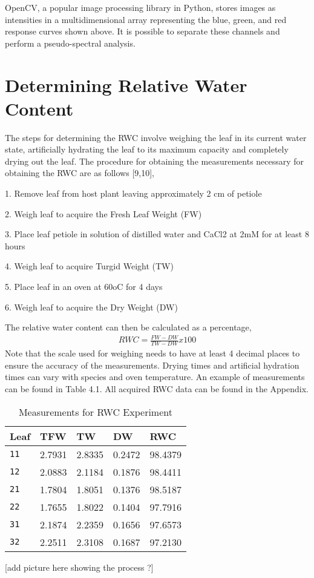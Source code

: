 OpenCV, a popular image processing library in Python, stores images as intensities in a multidimensional array representing the blue, green, and red response curves shown above.  It is possible to separate these channels and perform a pseudo-spectral analysis.

\section{Determining Relative Water Content}
The steps for determining the RWC involve weighing the leaf in its current water state, artificially hydrating the leaf to its maximum capacity and completely drying out the leaf.  The procedure for obtaining the measurements necessary for obtaining the RWC are as follows [9,10],

1.	Remove leaf from host plant leaving approximately 2 cm of petiole

2.	Weigh leaf to acquire the Fresh Leaf Weight (FW)

3.	Place leaf petiole in solution of distilled water and CaCl2 at 2mM for at least 8 hours

4.	Weigh leaf to acquire Turgid Weight (TW)

5.	Place leaf in an oven at 60oC for 4 days

6.	Weigh leaf to acquire the Dry Weight (DW)


The relative water content can then be calculated as a percentage,
%
\begin{align}
    RWC = \frac{FW - DW}{TW - DW} x 100%
\end{align}
%
Note that the scale used for weighing needs to have at least 4 decimal places to ensure the accuracy of the measurements. Drying times and artificial hydration times can vary with species and oven temperature. An example of measurements can be found in Table 4.1.  All acquired RWC data can be found in the Appendix.
%
\begin{table}[htb]
  \centering
  \begin{tabular}{lllll}
    \toprule
    \textbf{Leaf} & \textbf{TFW} & \textbf{TW} & \textbf{DW} & \textbf{RWC} \\
    \midrule
      \texttt{11} & 2.7931 & 2.8335 & 0.2472 & 98.4379 \\
      \texttt{12} & 2.0883 & 2.1184 & 0.1876 & 98.4411 \\
      \texttt{21} & 1.7804 & 1.8051 & 0.1376 & 98.5187 \\
      \texttt{22} & 1.7655 & 1.8022 & 0.1404 & 97.7916 \\
      \texttt{31} & 2.1874 & 2.2359 & 0.1656 & 97.6573 \\
      \texttt{32} & 2.2511 & 2.3108 & 0.1687 & 97.2130 \\
    \bottomrule
  \end{tabular}
  \caption{%
    Measurements for RWC Experiment
  }
  \label{tab:Packages}
\end{table}
%
[add picture here showing the process ?]

